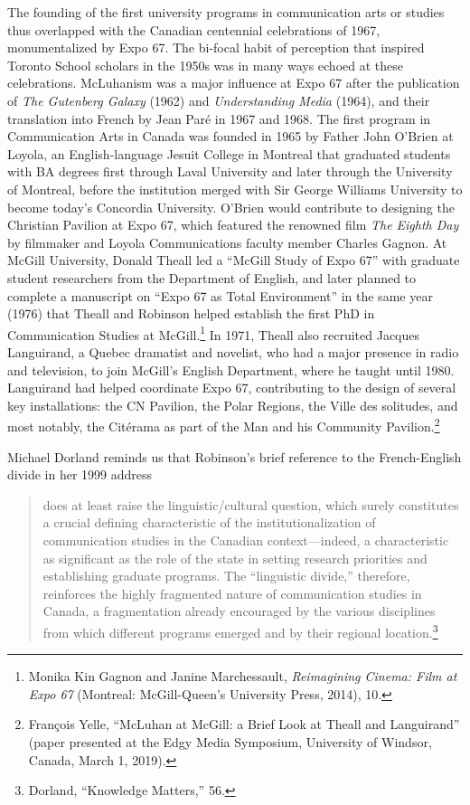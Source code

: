 \documentclass{tufte-handout}
\begin{document}
The founding of the first university programs in communication arts or
studies thus overlapped with the Canadian centennial celebrations of
1967, monumentalized by Expo 67. The bi-focal habit of perception that
inspired Toronto School scholars in the 1950s was in many ways echoed at
these celebrations. McLuhanism was a major influence at Expo 67 after
the publication of \emph{The Gutenberg Galaxy} (1962) and
\emph{Understanding Media} (1964), and their translation into French by
Jean Paré in 1967 and 1968. The first program in Communication Arts in
Canada was founded in 1965 by Father John O'Brien at Loyola, an
English-language Jesuit College in Montreal that graduated students with
BA degrees first through Laval University and later through the
University of Montreal, before the institution merged with Sir George
Williams University to become today's Concordia University. O'Brien
would contribute to designing the Christian Pavilion at Expo 67, which
featured the renowned film \emph{The Eighth Day} by filmmaker and Loyola
Communications faculty member Charles Gagnon. At McGill University,
Donald Theall led a ``McGill Study of Expo 67'' with graduate student
researchers from the Department of English, and later planned to
complete a manuscript on ``Expo 67 as Total Environment'' in the same
year (1976) that Theall and Robinson helped establish the first PhD in
Communication Studies at McGill.\footnote{Monika Kin Gagnon and Janine
  Marchessault, \emph{Reimagining Cinema: Film at Expo 67} (Montreal:
  McGill-Queen's University Press, 2014), 10.} In 1971, Theall also
recruited Jacques Languirand, a Quebec dramatist and novelist, who had a
major presence in radio and television, to join McGill's English
Department, where he taught until 1980. Languirand had helped coordinate
Expo 67, contributing to the design of several key installations: the CN
Pavilion, the Polar Regions, the Ville des solitudes, and most notably,
the Citérama as part of the Man and his Community Pavilion.\footnote{François
  Yelle, ``McLuhan at McGill: a Brief Look at Theall and Languirand''
  (paper presented at the Edgy Media Symposium, University of Windsor,
  Canada, March 1, 2019).}

Michael Dorland reminds us that Robinson's brief reference to the
French-English divide in her 1999 address

\begin{quote}
does at least raise the linguistic/cultural question, which surely
constitutes a crucial defining characteristic of the
institutionalization of communication studies in the Canadian
context---indeed, a characteristic as significant as the role of the
state in setting research priorities and establishing graduate programs.
The ``linguistic divide,'' therefore, reinforces the highly fragmented
nature of communication studies in Canada, a fragmentation already
encouraged by the various disciplines from which different programs
emerged and by their regional location.\footnote{Dorland, ``Knowledge
  Matters,'' 56.}
\end{quote}
\end{document}
